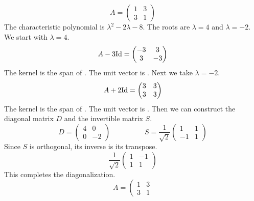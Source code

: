 \documentclass[fleqn]{report}
\begin{document}
\begin{example}
\begin{equation*}
A = \left( 
\begin{matrix}
1 & 3 \\ 3 & 1 
\end{matrix}
\right)
\end{equation*}
The characteristic polynomial is $\lambda^2 - 2\lambda - 8$.
The roots are $\lambda = 4$ and $\lambda = -2$. We start with
$\lambda = 4$. 
\begin{equation*}
A - 3 \mathrm{Id} = \left( 
\begin{matrix}
-3 & 3 \\ 3 & -3 
\end{matrix}
\right)
\end{equation*}
The kernel is the span of .
The unit vector is . Next we take $\lambda = -2$.
\begin{equation*}
A + 2 \mathrm{Id} = \left( 
\begin{matrix}
3 & 3 \\ 3 & 3 
\end{matrix}
\right)
\end{equation*}
The kernel is the span of .
The unit vector is . Then we can construct the diagonal matrix
$D$ and the invertible matrix $S$.
\begin{equation*}
D = \left( 
\begin{matrix}
4 & 0 \\ 0 & -2 
\end{matrix}
\right)
\hspace{2cm} 
S = \frac{1}{\sqrt{2}} \left( 
\begin{matrix}
1 & 1 \\ -1 & 1 
\end{matrix}
\right)
\end{equation*}
Since $S$ is orthogonal, its inverse is its transpose.
\begin{equation*}
\frac{1}{\sqrt{2}} \left( 
\begin{matrix}
1 & -1 \\ 1 & 1 
\end{matrix}
\right)
\end{equation*}
This completes the diagonalization.
\begin{equation*}
A = \left( 
\begin{matrix}
1 & 3 \\ 3 & 1 

\end{matrix}
\end{equation*}
\end{example}
\end{document}
